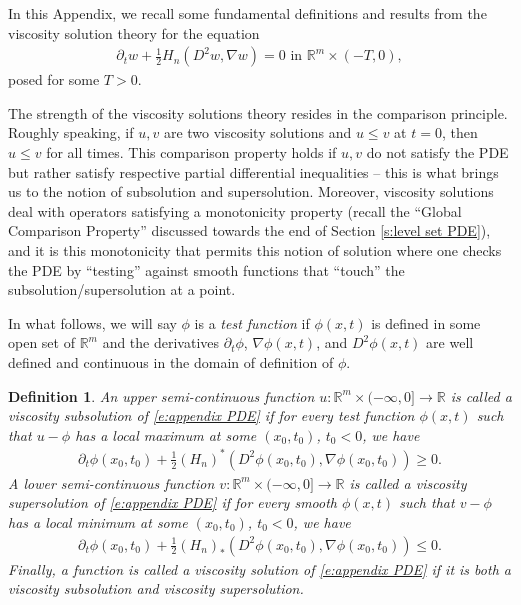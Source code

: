 \documentclass[reqno]{amsart}
\newtheorem{defn}[theorem]{Definition}
\numberwithin{equation}{section}
\begin{document}
In this Appendix, we recall some fundamental definitions and results from the viscosity solution theory for the equation
\begin{align}\label{e:appendix PDE}
  \partial_t w + \tfrac{1}{2}H_n(D^2w,\nabla w) = 0 \text{ in } \mathbb{R}^m\times (-T,0),    
\end{align}
posed for some $T>0$. 

The strength of the viscosity solutions theory resides in the comparison principle. Roughly speaking, if $u,v$ are two viscosity solutions and $u\leq v$ at $t=0$, then $u\leq v$ for all times. This comparison property holds if $u,v$ do not satisfy the PDE but rather satisfy respective partial differential inequalities -- this is what brings us to the notion of subsolution and supersolution. Moreover, viscosity solutions deal with operators satisfying a monotonicity property (recall the ``Global Comparison Property'' discussed towards the end of Section \ref{s:level set PDE}), and it is this monotonicity that permits this notion of solution where one checks the PDE by ``testing'' against smooth functions that ``touch'' the subsolution/supersolution at a point. 

In what follows, we will say $\phi$ is a \emph{test function} if $\phi(x,t)$ is defined in some open set of $\mathbb{R}^m$ and the derivatives $\partial_t\phi$, $\nabla\phi(x,t)$, and $D^2\phi(x,t)$ are well defined and continuous in the domain of definition of $\phi$.

\begin{defn}\label{d:definition of viscosity subsolutions and supersolutions}
  An upper semi-continuous function $u:\mathbb{R}^m\times (-\infty,0]\to\mathbb{R}$ is called a viscosity subsolution of \eqref{e:appendix PDE} if for every test function $\phi(x,t)$ such that $u-\phi$ has a local maximum at some $(x_0,t_0)$, $t_0<0$, we have
  \begin{align*}
    \partial_t \phi(x_0,t_0) + \tfrac{1}{2}(H_n)^*(D^2\phi(x_0,t_0),\nabla\phi(x_0,t_0)) \geq 0.    
  \end{align*}
  A lower semi-continuous function $v:\mathbb{R}^m\times (-\infty,0]\to\mathbb{R}$ is called a viscosity supersolution of \eqref{e:appendix PDE} if for every smooth $\phi(x,t)$ such that $v-\phi$ has a local minimum at some $(x_0,t_0)$, $t_0<0$, we have 
  \begin{align*}
    \partial_t \phi(x_0,t_0) + \tfrac{1}{2}(H_n)_*(D^2\phi(x_0,t_0),\nabla\phi(x_0,t_0)) \leq 0.    
  \end{align*}
  Finally, a function is called a viscosity solution of \eqref{e:appendix PDE} if it is both a viscosity subsolution and viscosity supersolution. 

\end{defn}
\end{document}
